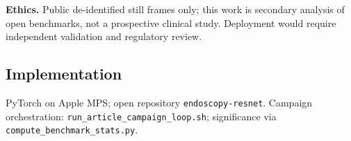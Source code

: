 \textbf{Ethics.} Public de-identified still frames only; this work is secondary analysis of open benchmarks, not a prospective clinical study.
Deployment would require independent validation and regulatory review.

\subsection{Implementation}
PyTorch on Apple MPS; open repository \texttt{endoscopy-resnet}.
Campaign orchestration: \texttt{run\_article\_campaign\_loop.sh}; significance via \texttt{compute\_benchmark\_stats.py}.
